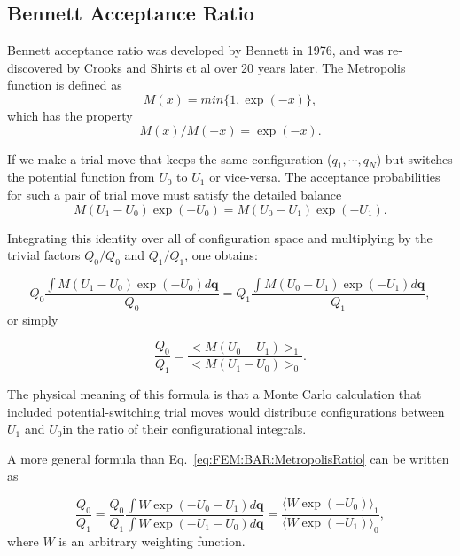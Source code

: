 \subsection{Bennett Acceptance Ratio\label{Sec:FEM:BAR}}
Bennett acceptance ratio was developed by Bennett in 1976,\cite{BennettJComputPhys1976} and was re-discovered by Crooks\cite{CrooksPRE2000} and Shirts et al\cite{ShirtsPRL2003} over 20 years later. The Metropolis function is defined as
\begin{equation}
	M(x)=min\{1,\exp{(-x)}\},
\end{equation}
which has the property 
\begin{equation}
	M(x)/M(-x)=\exp{(-x)}.
\end{equation}

If we make a trial move that keeps the same configuration ($q_{1},\cdots,q_{N}$)
but switches the potential function from $U_{0}$ to $U_{1}$ or vice-versa.
The acceptance probabilities for such a pair of trial move must satisfy
the detailed balance
\begin{equation}
	M(U_{1}-U_{0})\exp{(-U_{0})}=M(U_{0}-U_{1})\exp{(-U_{1})}.
\end{equation}

Integrating this identity over all of configuration space and multiplying
by the trivial factors $Q_{0}/Q_{0}$ and $Q_{1}/Q_{1}$, one obtains:

\begin{equation}
	Q_{0}\frac{\int M(U_{1}-U_{0})\exp{(-U_{0})}d\mathbf{{q}}}{Q_{0}}=Q_{1}\frac{\int M(U_{0}-U_{1})\exp{(-U_{1})}d\mathbf{{q}}}{Q_{1}},
\end{equation}
or simply

\begin{equation}
	\frac{Q_{0}}{Q_{1}}=\frac{<M(U_{0}-U_{1})>_{1}}{<M(U_{1}-U_{0})>_{0}}.\label{eq:FEM:BAR:MetropolisRatio}
\end{equation}

The physical meaning of this formula is that a Monte Carlo calculation
that included potential-switching trial moves would distribute configurations
between $U_{1}$ and $U_{0}$in the ratio of their configurational
integrals. 

A more general formula than Eq.~\ref{eq:FEM:BAR:MetropolisRatio} can be written
as

\begin{equation}
	\frac{Q_{0}}{Q_{1}}=\frac{Q_{0}}{Q_{1}}\frac{\int W\exp{(-U_{0}-U_{1})}d\mathbf{{q}}}{\int W\exp{(-U_{1}-U_{0})}d\mathbf{{q}}}=\frac{\langle W\exp{(-U_{0})}\rangle_{1}}{\langle W\exp{(-U_{1})}\rangle_{0}},\label{eq:FEM:BAR:weightedratio}
\end{equation}
where $W$ is an arbitrary weighting function.

